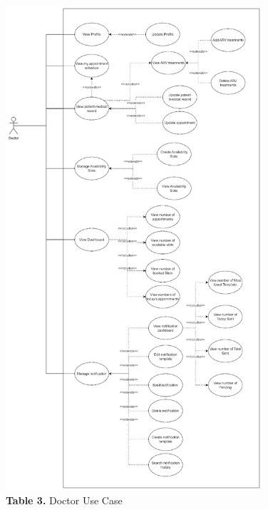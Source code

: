 \documentclass[12pt,a4paper]{article}
\begin{document}
\begin{figure}[H]
    \centering
    \includegraphics[width=0.85\textwidth]{diagrams/Picture/Usecase3.png}
    \caption*{\textbf{Table 3.} Doctor Use Case}
\end{figure}
\end{document}
